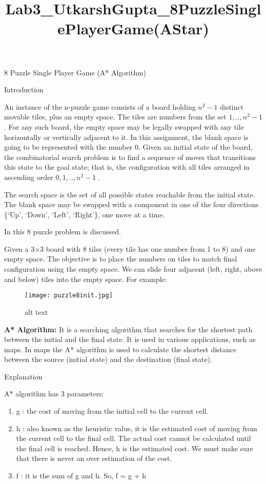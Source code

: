 \documentclass[11pt]{article}
\title{Lab3\_UtkarshGupta\_8PuzzleSinglePlayerGame(AStar)}
\providecommand{\tightlist}{%
      \setlength{\itemsep}{0pt}\setlength{\parskip}{0pt}}
\begin{document}
    
    \maketitle
    
    

    
    8 Puzzle Single Player Game (A* Algorithm)

    Introduction

An instance of the n-puzzle game consists of a board holding \(n^{2}-1\)
distinct movable tiles, plus an empty space. The tiles are numbers from
the set \(1,..,n^{2}-1\). For any such board, the empty space may be
legally swapped with any tile horizontally or vertically adjacent to it.
In this assignment, the blank space is going to be represented with the
number 0. Given an initial state of the board, the combinatorial search
problem is to find a sequence of moves that transitions this state to
the goal state; that is, the configuration with all tiles arranged in
ascending order \(0,1,..,n^{2}-1\) .

The search space is the set of all possible states reachable from the
initial state. The blank space may be swapped with a component in one of
the four directions \{`Up', `Down', `Left', `Right'\}, one move at a
time.

    In this 8 puzzle problem is discussed.

Given a 3×3 board with 8 tiles (every tile has one number from 1 to 8)
and one empty space. The objective is to place the numbers on tiles to
match final configuration using the empty space. We can slide four
adjacent (left, right, above and below) tiles into the empty space. For
example:

\begin{figure}
\centering
\texttt{[image: puzzle8init.jpg]}
\caption{alt text}
\end{figure}

    \textbf{A* Algorithm:} It is a searching algorithm that searches for the
shortest path between the initial and the final state. It is used in
various applications, such as maps. In maps the A* algorithm is used to
calculate the shortest distance between the source (initial state) and
the destination (final state).

    Explanation

A* algorithm has 3 parameters:

\begin{enumerate}
\def\labelenumi{\arabic{enumi}.}
\tightlist
\item
  g : the cost of moving from the initial cell to the current cell.
\item
  h : also known as the heuristic value, it is the estimated cost of
  moving from the current cell to the final cell. The actual cost cannot
  be calculated until the final cell is reached. Hence, h is the
  estimated cost. We must make sure that there is never an over
  estimation of the cost.
\item
  f : it is the sum of g and h. So, f = g + h
\end{enumerate}
\end{document}
